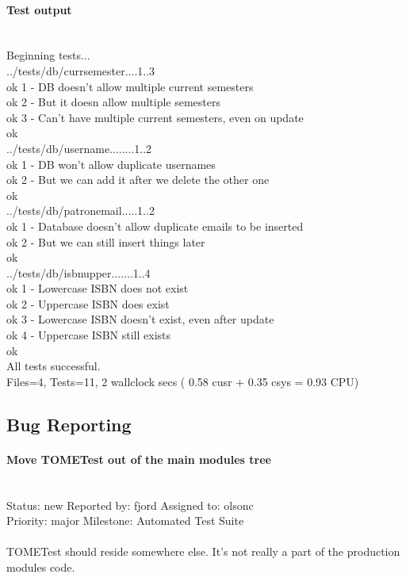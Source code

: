 \documentclass[12pt,titlepage]{article}
\begin{document}
\paragraph{Test output}
\hspace{1pt}\\ Beginning tests...\\
../tests/db/currsemester....1..3\\
ok 1 - DB doesn't allow multiple current semesters\\
ok 2 - But it doesn allow multiple semesters\\
ok 3 - Can't have multiple current semesters, even on update\\
ok\\
../tests/db/username........1..2\\
ok 1 - DB won't allow duplicate usernames\\
ok 2 - But we can add it after we delete the other one\\
ok\\
../tests/db/patronemail.....1..2\\
ok 1 - Database doesn't allow duplicate emails to be inserted\\
ok 2 - But we can still insert things later\\
ok\\
../tests/db/isbnupper.......1..4\\
ok 1 - Lowercase ISBN does not exist\\
ok 2 - Uppercase ISBN does exist\\
ok 3 - Lowercase ISBN doesn't exist, even after update\\
ok 4 - Uppercase ISBN still exists\\
ok\\
All tests successful.\\
Files=4, Tests=11, 2 wallclock secs ( 0.58 cusr + 0.35 csys = 0.93 CPU)

\subsection{Bug Reporting}
\paragraph{Move TOMETest out of the main modules tree}
\hspace{1pt}\\ Status: new		Reported by: fjord	Assigned to: olsonc\\
Priority: major	Milestone: Automated Test Suite\\
\hspace{1pt}\\
TOMETest should reside somewhere else. It's not really a part of the production modules code.
\end{document}
